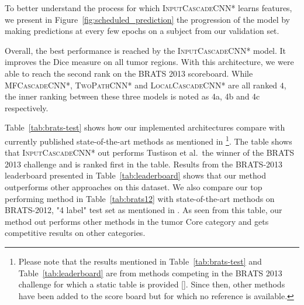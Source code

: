 \documentclass[final,5p,times,twocolumn]{elsarticle}
\newcommand{\PMJ}[1]{\textcolor{green}{\small{}[\textbf{Pierre-Marc:} #1]}}
\begin{document}
{To better understand the process for which \textsc{InputCascadeCNN*} learns features, we present in Figure~\ref{fig:scheduled_prediction} the progression of the model by making predictions at every few epochs on a subject from our validation set. 

Overall, the best performance is reached by the \textsc{InputCascadeCNN*} model. It improves the Dice measure on all tumor regions. With this architecture, we were able to reach the second rank on the BRATS 2013 scoreboard. While \textsc{MFCascadeCNN*}, \textsc{TwoPathCNN*} and \textsc{LocalCascadeCNN*} are all ranked $4$, the inner ranking between these three models is noted as 4a, 4b and 4c respectively.  %


Table~\ref{tab:brats-test} shows how our implemented architectures compare with currently published state-of-the-art methods as mentioned in \citep{Menze2014}\footnote{Please note that the results mentioned in Table~\ref{tab:brats-test} and Table~\ref{tab:leaderboard} are from methods competing in the BRATS 2013 challenge for which a static table is provided []. Since then, other methods have been added to the score board but for which no reference is available.}.  %
The table shows that \textsc{InputCascadeCNN*} out performs Tustison et al.\, the winner of the BRATS 2013 challenge and is ranked first in the table.  Results from the BRATS-2013 leaderboard presented in Table~\ref{tab:leaderboard}  shows that our method outperforms other approaches on this dataset. We also compare our top performing method in Table~\ref{tab:brats12} with state-of-the-art methods on BRATS-2012, "4 label" test set as mentioned in \citep{Menze2014}. As seen from this table, our method out performs other methods in the tumor Core category and gets competitive results on other categories.

}
\end{document}
